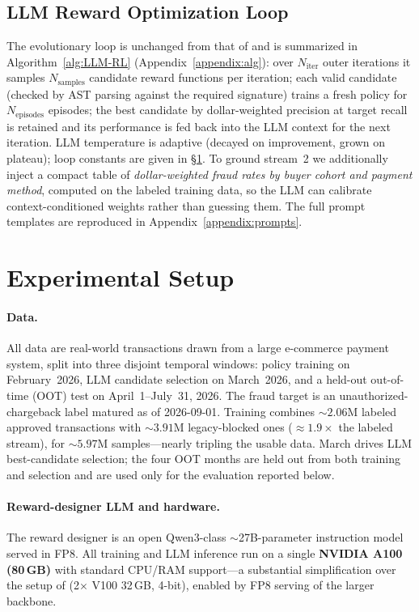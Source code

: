 \documentclass[11pt]{article}
\begin{document}
\subsection{LLM Reward Optimization Loop}
The evolutionary loop is unchanged from that of \citet{qu2025llmenhanced} and is summarized in
Algorithm~\ref{alg:LLM-RL} (Appendix~\ref{appendix:alg}): over $N_\text{iter}$ outer iterations it samples $N_\text{samples}$
candidate reward functions per iteration; each valid candidate (checked by AST parsing
against the required signature) trains a fresh policy for $N_\text{episodes}$ episodes; the
best candidate by dollar-weighted precision at target recall is retained and its performance
is fed back into the LLM context for the next iteration. LLM temperature is adaptive (decayed
on improvement, grown on plateau); loop constants are given in \S\ref{sec:setup}. To ground stream~2 we additionally inject a compact table of
\emph{dollar-weighted fraud rates by buyer cohort and payment method}, computed on the labeled
training data, so the LLM can calibrate context-conditioned weights rather than guessing them.
The full prompt templates are reproduced in Appendix~\ref{appendix:prompts}.

\section{Experimental Setup}
\label{sec:setup}

\paragraph{Data.}
All data are real-world transactions drawn from a large e-commerce payment system, split into
three disjoint temporal windows: policy training on February~2026, LLM candidate selection on
March~2026, and a held-out out-of-time (OOT) test on April~1--July~31, 2026. The fraud target is an
unauthorized-chargeback label matured as of 2026-09-01. Training combines ${\sim}2.06$M labeled
approved transactions with ${\sim}3.91$M legacy-blocked ones ($\approx\!1.9\times$ the labeled
stream), for ${\sim}5.97$M samples---nearly tripling the usable data. March drives LLM
best-candidate selection; the four OOT months are held out from both training and selection and
are used only for the evaluation reported below.

\paragraph{Reward-designer LLM and hardware.}
The reward designer is an open Qwen3-class $\sim$27B-parameter instruction model served in
FP8. All training and LLM inference run on a single \textbf{NVIDIA A100 (80\,GB)} with
standard CPU/RAM support---a substantial simplification over the setup of \citet{qu2025llmenhanced} (2$\times$
V100 32\,GB, 4-bit), enabled by FP8 serving of the larger backbone.
\end{document}
